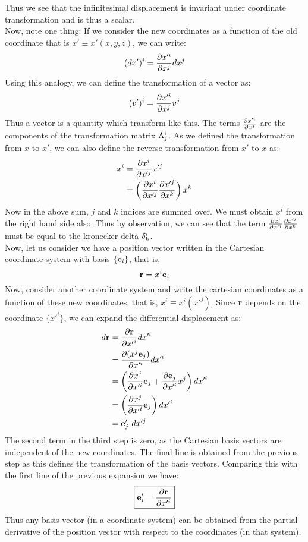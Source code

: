 Thus we see that the infinitesimal displacement is invariant under coordinate transformation and is thus a scalar.\\[0.3cm]
Now, note one thing: If we consider the new coordinates as a function of the old coordinate that is $x' \equiv x'(x,y,z)$, we can write: 
$$(dx')^i = \pdv{x'^i}{x^j}dx^j$$
Using this analogy, we can define the transformation of a vector as:
$$(v')^i = \pdv{x'^i}{x^j}v^j$$
Thus a vector is a quantity which transform like this. The terms $\pdv{x'^i}{x^j}$ are the components of the transformation matrix $\tensor*{\Lambda}{^i_j}$.
As we defined the transformation from $x$ to $x'$, we can also define the reverse transformation from $x'$ to $x$ as:
\begin{align*}
    x^i &= \pdv{x^i}{x'^j} x'^j \\
    & =  \left( \pdv{x^i}{x'^j}\pdv{x'^j}{x^k} \right)x^k \\
\end{align*}
Now in the above sum, $j$ and $k$ indices are summed over. We must obtain $x^i$ from the right hand side also. Thus by observation, we can see that the term $\pdv{x^i}{x'^j}\pdv{x'^j}{x^k}$ must be equal to the kronecker delta $\tensor*{\delta}{^i_k}$.\\[0.3cm]
Now, let us consider we have a position vector written in the Cartesian coordinate system with basis $\{\boldsymbol{\mathbf{e}}_i\}$, that is, $$\boldsymbol{\mathbf{r}} = x^i \boldsymbol{\mathbf{e}}_i$$ Now, consider another coordinate system and write the cartesian coordinates as a function of these new coordinates, that is, $x^i \equiv x^i(x'^j)$.
Since $\boldsymbol{\mathbf{r}}$ depends on the coordinate $\{x'^i\}$, we can expand the differential displacement as:
\begin{align*}
    d\boldsymbol{\mathbf{r}} &= \pdv{\boldsymbol{\mathbf{r}}}{{x'}^i}dx'^i \\
    &= \pdv{(x^j \boldsymbol{\mathbf{e}}_j)}{x'^i}dx'^i \\
    &=\left( \pdv{x^j }{x'^i}\boldsymbol{\mathbf{e}}_j + \pdv{ \boldsymbol{\mathbf{e}}_j}{x'^i}x^j  \right)dx'^i\\
    &=\left( \pdv{x^j }{x'^i}\boldsymbol{\mathbf{e}}_j \right)dx'^i\\
    &=\boldsymbol{\mathbf{e}}_j'\ dx'^j
\end{align*}
The second term in the third step is zero, as the Cartesian basis vectors are independent of the new coordinates. The final line is obtained from the previous step as this defines the transformation of the basis vectors. 
Comparing this with the first line of the previous expansion we have:
$$\boxed{\boldsymbol{\mathbf{e}}'_i = \pdv{\boldsymbol{\mathbf{r}}}{x'^i}}$$
Thus any basis vector (in a coordinate system) can be obtained from the partial derivative of the position vector with respect to the coordinates (in that system).
